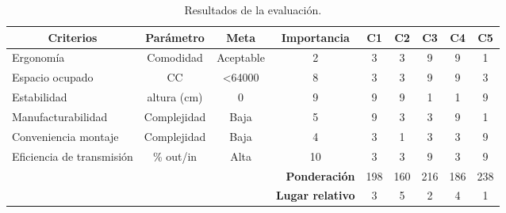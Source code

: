 \begin{table}[h]
\centering
\scriptsize
\begin{tabular}{@{}lcccccccc@{}}
\toprule
\multicolumn{1}{c}{\textbf{Criterios}} & \textbf{Parámetro} & \textbf{Meta}   & \textbf{Importancia}               & \textbf{C1} & \textbf{C2} & \textbf{C3} & \textbf{C4} & \textbf{C5} \\ \midrule
Ergonomía                              & Comodidad          & Aceptable       & 2                                  & 3           & 3           & 9           & 9           & 1           \\
Espacio ocupado                        & CC                 & \textless 64000 & 8                                  & 3           & 3           & 9           & 9           & 3           \\
Estabilidad                            & altura (cm)        & 0               & 9                                  & 9           & 9           & 1           & 1           & 9           \\
Manufacturabilidad                     & Complejidad        & Baja            & 5                                  & 9           & 3           & 3           & 9           & 1           \\
Conveniencia montaje                   & Complejidad        & Baja            & 4                                  & 3           & 1           & 3           & 3           & 9           \\
Eficiencia de transmisión              & \% out/in          & Alta            & 10                                 & 3           & 3           & 9           & 3           & 9           \\
\multicolumn{3}{l}{\multirow{2}{*}{}}                                         & \multicolumn{1}{r}{\textbf{Ponderación}}    & 198         & 160         & 216         & 186         & 238         \\
\multicolumn{3}{l}{}                                                          & \multicolumn{1}{r}{\textbf{Lugar relativo}} & 3           & 5           & 2           & 4           & 1           \\ \cmidrule(l){4-9} 
\end{tabular}
\caption{Resultados de la evaluación.}
\label{tab:evaluacion_conceptos}
\end{table}
